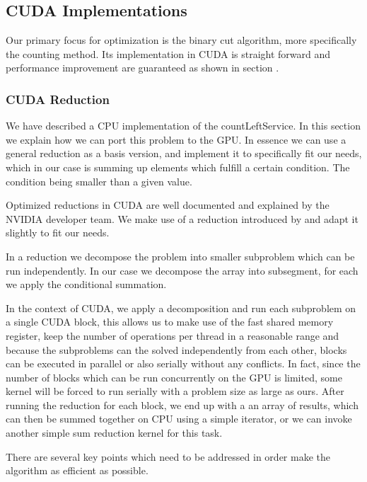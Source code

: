 \documentclass[]{article}
\begin{document}
\subsection{CUDA Implementations}

Our primary focus for optimization is the binary cut algorithm, more specifically the counting method. Its implementation in CUDA is straight forward and performance improvement are guaranteed as shown in section . 

\subsubsection{CUDA Reduction}
We have described a CPU implementation of the countLeftService. In this section we explain how we can port this problem to the GPU. In essence we can use a general reduction as a basis version, and implement it to specifically fit our needs, which in our case is summing up elements which fulfill a certain condition. The condition being smaller than a given value.

Optimized reductions in CUDA are well documented and explained by the NVIDIA developer team. We make use of a reduction introduced by  and adapt it slightly to fit our needs.

In a reduction we decompose the problem into smaller subproblem which can be run independently. In our case we decompose the array into subsegment, for each we apply the conditional summation. 

In the context of CUDA, we apply a decomposition and run each subproblem on a single CUDA block, this allows us to make use of the fast shared memory register, keep the number of operations per thread in a reasonable range and because the subproblems can the solved independently from each other, blocks can be executed in parallel or also serially without any conflicts. In fact, since the number of blocks which can be run concurrently on the GPU is limited, some kernel will be forced to run serially with a problem size as large as ours.  After running the reduction for each block, we end up with a an array of results, which can then be summed together on CPU using a simple iterator, or we can invoke another simple sum reduction kernel for this task.

There are several key points which need to be addressed in order make the algorithm as efficient as possible. 
\end{document}
